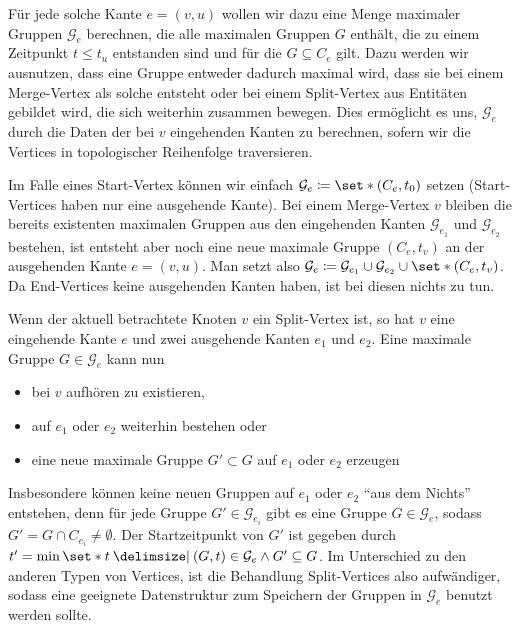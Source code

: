 Für jede solche Kante $e=(v,u)$ wollen wir dazu eine Menge maximaler Gruppen $\mathcal{G}_e$ berechnen, die alle maximalen Gruppen $G$ enthält, die zu einem Zeitpunkt $t \le t_u$ entstanden sind und für die $G \subseteq C_e$ gilt.
Dazu werden wir ausnutzen, dass eine Gruppe entweder dadurch maximal wird, dass sie bei einem Merge-Vertex als solche entsteht oder bei einem Split-Vertex aus Entitäten gebildet wird, die sich weiterhin zusammen bewegen.
Dies ermöglicht es uns, $\mathcal{G}_e$ durch die Daten der bei $v$ eingehenden Kanten zu berechnen, sofern wir die Vertices in topologischer Reihenfolge traversieren.

Im Falle eines Start-Vertex können wir einfach $\mathcal{G}_e \coloneqq \set*{(C_e,t_0)}$ setzen (Start-Vertices haben nur eine ausgehende Kante).
Bei einem Merge-Vertex $v$ bleiben die bereits existenten maximalen Gruppen aus den eingehenden Kanten $\mathcal{G}_{e_1}$ und $\mathcal{G}_{e_2}$ bestehen, ist entsteht aber noch eine neue maximale Gruppe $(C_e,t_v)$ an der ausgehenden Kante $e=(v,u)$.
Man setzt also $\mathcal{G}_e \coloneqq \mathcal{G}_{e_1} \cup \mathcal{G}_{e_2} \cup \set*{(C_e,t_v)}$.
Da End-Vertices keine ausgehenden Kanten haben, ist bei diesen nichts zu tun.

Wenn der aktuell betrachtete Knoten $v$ ein Split-Vertex ist, so hat $v$ eine eingehende Kante $e$ und zwei ausgehende Kanten $e_1$ und $e_2$.
Eine maximale Gruppe $G \in \mathcal{G}_e$ kann nun
\begin{itemize}
	\item bei $v$ aufhören zu existieren,
	\item auf $e_1$ oder $e_2$ weiterhin bestehen oder
	\item eine neue maximale Gruppe $G' \subset G$ auf $e_1$ oder $e_2$ erzeugen
\end{itemize}
Insbesondere können keine neuen Gruppen auf $e_1$ oder $e_2$ \enquote{aus dem Nichts} entstehen, denn für jede Gruppe $G' \in \mathcal{G}_{e_i}$ gibt es eine Gruppe $G \in \mathcal{G}_e$, sodass $G' = G \cap C_{e_i} \neq \emptyset$.
Der Startzeitpunkt von $G'$ ist gegeben durch $t' = \min \set*{t \given (G,t) \in \mathcal{G}_e \wedge G' \subseteq G}$.
Im Unterschied zu den anderen Typen von Vertices, ist die Behandlung Split-Vertices also aufwändiger, sodass eine geeignete Datenstruktur zum Speichern der Gruppen in $\mathcal{G}_e$ benutzt werden sollte.





